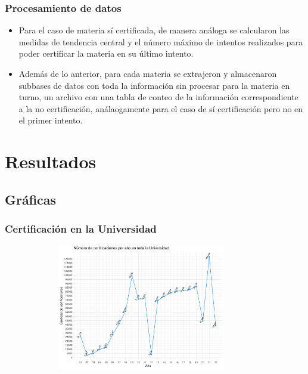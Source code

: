 \documentclass[xcolor=dvipsnames]{beamer}
\begin{document}
\begin{frame}\frametitle{Procesamiento de datos}
\begin{itemize}

\item Para el caso de materia s\'i certificada, de manera an\'aloga se calcularon las medidas de tendencia central y el n\'umero m\'aximo de intentos realizados para poder certificar la materia en su \'ultimo intento. 

\item Adem\'as de lo anterior, para cada materia se extrajeron y almacenaron subbases de datos con toda la informaci\'on sin procesar para la materia en turno, un archivo con una tabla de conteo de la informaci\'on correspondiente a la no certificaci\'on, an\'alaogamente para el caso de s\'i certificaci\'on pero no en el primer intento. 

\end{itemize}
\end{frame}

\section{Resultados}

\subsection{Gr\'aficas}

\begin{frame}\frametitle{Certificaci\'on en la Universidad}
\textbf{
}
\begin{figure}[H]
\centering
\includegraphics[width=10cm,height=5.5cm]{Imagenes/graficoCertificacionesUACManual.pdf}
\end{figure}
\end{frame}
\end{document}
